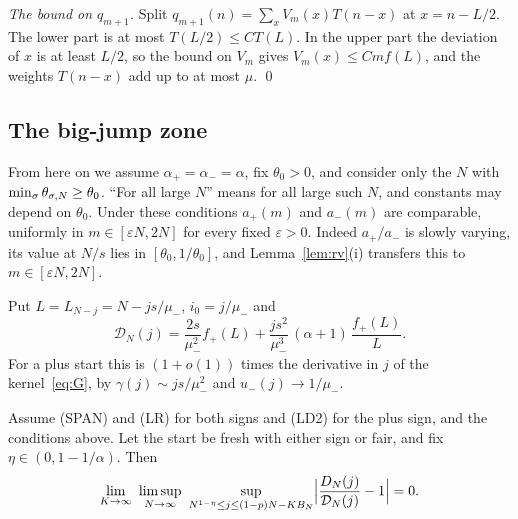 \emph{The bound on $q_{m+1}$.} Split $q_{m+1}(n)=\sum_xV_m(x)T(n-x)$ at $x=n-L/2$. The lower part
is at most $T(L/2)\le CT(L)$. In the upper part the deviation of $x$ is at least $L/2$, so the
bound on $V_m$ gives $V_m(x)\le Cmf(L)$, and the weights $T(n-x)$ add up to at most $\mu$.
\qed

\subsection{The big-jump zone}\label{app:zone}

From here on we assume $\alpha_\plus=\alpha_\minus=\alpha$, fix $\theta_0>0$, and consider only
the $N$ with $\min_\sigma\theta_{\sigma,N}\ge\theta_0$. ``For all large $N$'' means for all large
such $N$, and constants may depend on $\theta_0$. Under these conditions $a_\plus(m)$ and
$a_\minus(m)$ are comparable, uniformly in $m\in[\varepsilon N,2N]$ for every fixed
$\varepsilon>0$. Indeed $a_\plus/a_\minus$ is slowly varying, its value at $N/s$ lies in
$[\theta_0,1/\theta_0]$, and Lemma~\ref{lem:rv}(i) transfers this to $m\in[\varepsilon N,2N]$.

Put $L=L_{N-j}=N-js/\mu_\minus$, $i_0=j/\mu_\minus$ and
\[
 \mathcal D_N(j)=\frac{2s}{\mu_\minus^2}f_\plus(L)+\frac{js^2}{\mu_\minus^3}\,(\alpha+1)\,\frac{f_\plus(L)}L .
\]
For a plus start this is $(1+o(1))$ times the derivative in $j$ of the kernel~\eqref{eq:G}, by
$\gamma(j)\sim js/\mu_\minus^2$ and $u_\minus(j)\to1/\mu_\minus$.

\begin{theorem}\label{thm:zone-diff}
Assume (SPAN) and (LR) for both signs and (LD2) for the plus sign, and the conditions above. Let
the start be fresh with either sign or fair, and fix $\eta\in(0,1-1/\alpha)$. Then
\[
 \lim_{K\to\infty}\ \limsup_{N\to\infty}\ \sup_{N^{1-\eta}\le j\le(1-p)N-KB_N}
 \Bigl|\frac{D_N(j)}{\mathcal D_N(j)}-1\Bigr|=0 .
\]
\end{theorem}

